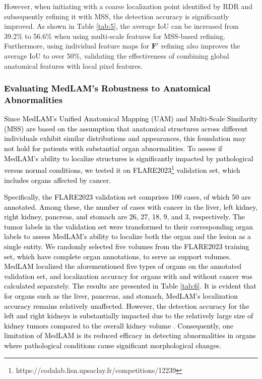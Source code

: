 \documentclass[times,twocolumn,final]{elsarticle}
\begin{document}
However, when initiating with a coarse localization point identified by RDR and subsequently refining it with MSS, the detection accuracy is significantly improved. As shown in Table \ref{tab:5}, the average IoU can be increased from 39.2\% to 56.6\% when using multi-scale features for MSS-based refining. Furthermore, using individual feature maps for $\bm{F}^i$ refining also improves the average IoU to over 50\%, validating the effectiveness of combining global anatomical features with local pixel features.

\textcolor{black}{
\subsubsection{Evaluating MedLAM's Robustness to Anatomical Abnormalities}
Since MedLAM's Unified Anatomical Mapping (UAM) and Multi-Scale Similarity (MSS) are based on the assumption that anatomical structures across different individuals exhibit similar distributions and appearances, this foundation may not hold for patients with substantial organ abnormalities. To assess if MedLAM's ability to localize structures is significantly impacted by pathological versus normal conditions, we tested it on FLARE2023\footnote{https://codalab.lisn.upsaclay.fr/competitions/12239} validation set, which includes organs affected by cancer.}
\par \textcolor{black}{Specifically, the FLARE2023 validation set comprises 100 cases, of which 50 are annotated. Among these, the number of cases with cancer in the liver, left kidney, right kidney, pancreas, and stomach are 26, 27, 18, 9, and 3, respectively. The tumor labels in the validation set were transformed to their corresponding organ labels to assess MedLAM's ability to localize both the organ and the lesion as a single entity. We randomly selected five volumes from the FLARE2023 training set, which have complete organ annotations, to serve as support volumes.  MedLAM localized the aforementioned five types of organs on the annotated validation set, and localization accuracy for organs with and without cancer was calculated separately. The results are presented in Table \ref{tab:6}. It is evident that for organs such as the liver, pancreas, and stomach, MedLAM's localization accuracy remains relatively unaffected. However, the detection accuracy for the left and right kidneys is substantially impacted due to the relatively large size of kidney tumors compared to the overall kidney volume \cite{heller2020state}. Consequently, one limitation of MedLAM is its reduced efficacy in detecting abnormalities in organs where pathological conditions cause significant morphological changes.}
\end{document}
